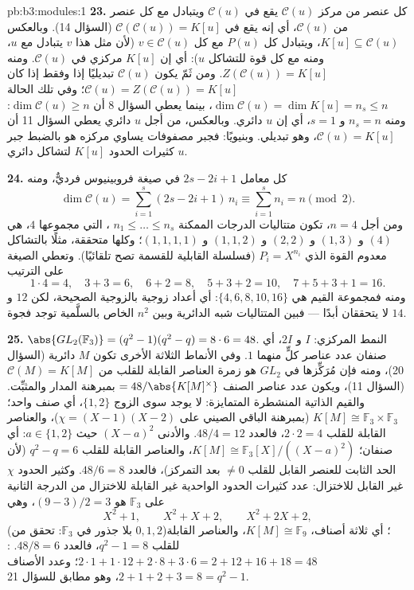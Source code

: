 \begin{solution}{pb:b3:modules:1}
\textbf{23.} كل عنصر من مركز $\mathcal C(u)$ يقع في
$\mathcal C(u)$ ويتبادل مع كل عنصر من $\mathcal C(u)$، أي إنه
يقع في $\mathcal C(\mathcal C(u)) =
K[u]$ (السؤال 14). وبالعكس $K[u] \subseteq \mathcal C(u)$، ويتبادل كل $P(u)$
مع كل $v \in \mathcal C(u)$ (لأن مثل هذا $v$ يتبادل مع $u$، ومنه مع كل قوة
للتشاكل $u$): أي إن $K[u]$ مركزي في $\mathcal C(u)$. ومنه $Z(\mathcal C(u))
= K[u]$.
ومن ثَمّ يكون $\mathcal C(u)$ تبديليًا إذا وفقط إذا كان $\mathcal C(u) = Z(\mathcal C(u)) = K[u]$؛
وفي تلك الحالة $\dim\mathcal C(u) = \dim K[u] = n_s \leq n$، بينما يعطي السؤال 8 أن $\dim\mathcal C(u) \geq n$: ومنه
$n_s = n$ و $s = 1$، أي إن $u$ دائري. وبالعكس، من أجل $u$
دائري يعطي السؤال 11 أن $\mathcal C(u) = K[u]$، وهو تبديلي. وبنيويًا: فجبر
مصفوفات يساوي مركزه هو بالضبط جبر كثيرات الحدود $K[u]$ لتشاكل
دائري $u$.

\textbf{24.} كل معامل $2s - 2i + 1$ في صيغة فروبينيوس فرديٌّ،
ومنه
\[
\dim\mathcal C(u) = \sum_{i=1}^s(2s - 2i + 1)\,n_i
\equiv \sum_{i=1}^s n_i = n \pmod 2 .
\]
ومن أجل $n = 4$، تكون متتاليات الدرجات الممكنة $n_1 \leq \dots
\leq n_s$ ، التي مجموعها $4$، هي $(4)$ و $(1, 3)$ و $(2, 2)$
و $(1, 1, 2)$ و $(1, 1, 1, 1)$؛ وكلها متحققة، مثلًا بالتشاكل
معدوم القوة الذي $P_i = X^{n_i}$ (فسلسلة القابلية للقسمة تصح
تلقائيًا). وتعطي الصيغة على الترتيب
\[
1\cdot4 = 4, \quad 3 + 3 = 6, \quad 6 + 2 = 8, \quad
5 + 3 + 2 = 10, \quad 7 + 5 + 3 + 1 = 16 .
\]
ومنه فمجموعة القيم هي $\{4, 6, 8, 10, 16\}$: أي أعداد زوجية بالزوجية الصحيحة،
لكن $12$ و $14$ لا يتحققان أبدًا --- فبين المتتاليات شبه
الدائرية وبين $n^2$ الخاص بالسلَّمية توجد فجوة.

\textbf{25.} $\abs{GL_2(\mathbb F_3)} = (q^2 - 1)(q^2 - q) =
8 \cdot 6 = 48$. النمط المركزي: $I$ و $2I$، أي صنفان عدد
عناصر كلٍّ منهما $1$. وفي الأنماط الثلاثة الأخرى تكون $M$
دائرية (السؤال 20)، ومنه فإن مُرَكِّزها في $GL_2$ هو زمرة
العناصر القابلة للقلب من $\mathcal C(M) = K[M]$ (السؤال 11)، ويكون عدد عناصر
الصنف $=48/\abs{K[M]^\times}$ بمبرهنة المدار والمثبِّت. والقيم الذاتية المنشطرة
المتمايزة: لا يوجد سوى الزوج $\{1, 2\}$، أي صنف واحد؛ $K[M]
\cong \mathbb F_3 \times \mathbb F_3$
(بمبرهنة الباقي الصيني على $\chi = (X-1)
(X-2)$)، والعناصر القابلة للقلب
$2 \cdot 2 = 4$، فالعدد $48/4 = 12$. والأدنى $(X - a)^2$ حيث
$a \in \{1, 2\}$: أي صنفان؛ $K[M] \cong
\mathbb F_3[X]/((X-a)^2)$، والعناصر القابلة للقلب
$q^2 - q = 6$ (لأن الحد الثابت للعنصر القابل للقلب $\neq 0$
بعد التمركز)، فالعدد $48/6 = 8$. وكثير الحدود $\chi$ غير القابل
للاختزال: عدد كثيرات الحدود الواحدية غير القابلة للاختزال من
الدرجة الثانية على $\mathbb F_3$ هو $(9 - 3)/2 = 3$، وهي
\[
X^2 + 1, \qquad X^2 + X + 2, \qquad X^2 + 2X + 2,
\]
(بلا جذور في $\mathbb F_3$: تحقق من $0, 1, 2$)؛ أي ثلاثة أصناف،
$K[M] \cong \mathbb F_9$، والعناصر القابلة للقلب $q^2 - 1 = 8$، فالعدد $48/8 =
6$.
: $2\cdot1 + 1\cdot12 + 2\cdot8 + 3\cdot6 =
2 + 12 + 16 + 18 = 48$؛ وعدد الأصناف $2 + 1 + 2 + 3 = 8 = q^2 - 1$، وهو مطابق
للسؤال 21.
\end{solution}
